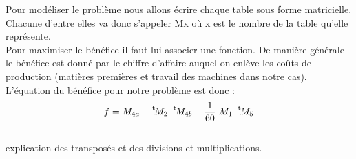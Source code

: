 \documentclass{article}
\newcommand*{\transp}[2][-3mu]{\ensuremath{\mskip1mu\prescript{\smash{\mathrm t\mkern#1}}{}{\mathstrut#2}}}
\begin{document}
Pour modéliser le problème nous allons écrire chaque table sous forme matricielle. Chacune d'entre elles va donc s'appeler Mx où x est le nombre de la table qu'elle représente.\\

Pour maximiser le bénéfice il faut lui associer une fonction. De manière générale le bénéfice est donné par le chiffre d'affaire auquel on enlève les coûts de production (matières premières et travail des machines dans notre cas).
L'équation du bénéfice pour notre problème est donc :\\
 
$$f=M_{4a} - \transp{M_2} \ \transp{M_{4b}} - \frac{1}{60} \ M_1 \ \transp{M_5}$$   \\

explication des transposés et des divisions et multiplications.
\end{document}
